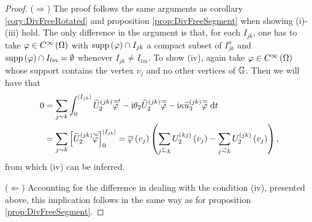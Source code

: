\begin{proof}
	($\Rightarrow$) The proof follows the same arguments as corollary \ref{cory:DivFreeRotated} and proposition \ref{prop:DivFreeSegment} when showing (i)-(iii) hold.
	The only difference in the argument is that, for each $I_{jk}$, one has to take $\varphi\in C^{\infty}\left( \Omega \right)$ with $\mathrm{supp}\left( \varphi \right)\cap I_{jk}$ a compact subset of $I_{jk}^{\mathrm{o}}$ and $\mathrm{supp}\left( \varphi \right)\cap I_{lm} = \emptyset$ whenever $I_{jk}\neq I_{lm}$.
	To show (iv), again take $\varphi\in C^{\infty}\left( \Omega \right)$ whose support contains the vertex $v_j$ and no other vertices of $\mathbb{G}$.
	Then we will have that
	\begin{align*}
		0
		&= \sum_{j\con k}\int_0^{\abs{I_{jk}}} \widetilde{U}_2^{(jk)}\overline{\widetilde{\varphi}}' - \rmi\qm_2\widetilde{U}_2^{(jk)}\overline{\widetilde{\varphi}} - \rmi\wavenumber\widetilde{u}_3^{(jk)}\overline{\widetilde{\varphi}} \ \md t  \\
		&= \sum_{j\con k}\sqbracs{ \widetilde{U}_2^{(jk)}\overline{\widetilde{\varphi}} }_0^{\abs{I_{jk}}}
		= \overline{\varphi}\bracs{v_j}\bracs{ \sum_{j\conRight k} U_2^{(kj)}\bracs{v_j} - \sum_{j\conLeft k} U_2^{(jk)}\bracs{v_j} },
	\end{align*}
	from which (iv) can be inferred.
	
	($\Leftarrow$) Accounting for the difference in dealing with the condition (iv), presented above, this implication follows in the same way as for proposition \ref{prop:DivFreeSegment}.
\end{proof}